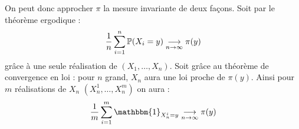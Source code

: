\begin{remark}
    On peut donc approcher $ \pi$ la mesure invariante de deux façons. Soit par le théorème ergodique : 
        \[  \frac{1}{n} \sum_{i=1}^{n} \mathbb{P}(X_i = y) \underset{n \to \infty}{\longrightarrow} \pi(y) \] 
    grâce à une seule réalisation de $(X_1, \dots, X_n)$. Soit grâce au théorème de convergence en loi : 
    pour $n$ grand, $X_n$ aura une loi proche de $ \pi(y)$. Ainsi pour $m$ réalisations de $X_n$ 
    $(X_n^1, \dots, X_n^m)$ on aura : 
        \[ \frac{1}{m} \sum_{i=1}^{m} \mathbbm{1}_{X_n^i = y} \underset{n \to \infty}{\longrightarrow} \pi(y) \] 
\end{remark}
